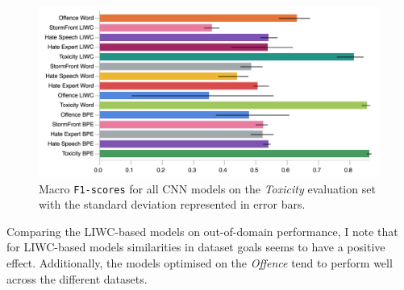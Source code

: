 \begin{figure}  
    \centering  
    \includegraphics[width=\textwidth]{all_cnn_wulczyn_test.pdf}  
    \caption{Macro \texttt{F1-scores} for all CNN models on the \textit{Toxicity} evaluation set with the standard deviation represented in error bars.}  
    \label{fig:wulczyn_cnn_test}  
\end{figure}  
  
Comparing the LIWC-based models on out-of-domain performance, I note that for LIWC-based models similarities in dataset goals seems to have a positive effect.  
Additionally, the models optimised on the \textit{Offence} tend to perform well across the different datasets.  
  
  
